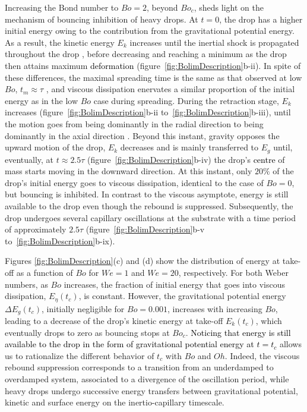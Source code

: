 \documentclass{jfm}
\newcommand{\Ohn}{\mathit{Oh}}
\newcommand{\Wen}{\mathit{We}}
\newcommand{\Bon}{\mathit{Bo}}
\newcommand{\Boc}{\mathit{Bo}_\mathit{c}}
\newcommand{\revRev}[1]{\textcolor{black}{#1}}
\begin{document}
Increasing the Bond number to $\Bon = 2$, beyond $\Boc$, sheds light on the mechanism of bouncing inhibition of heavy drops. At $t=0$, the drop has a higher initial energy owing to the contribution from the gravitational potential energy. As a result, the kinetic energy $E_k$ increases until the inertial shock is propagated throughout the drop \citep[see figure~\ref{fig:BolimDescription}b-i and][]{Gordillo2018, cheng2021drop}, before decreasing and reaching a minimum as the drop then attains maximum \revRev{deformation} (figure~\ref{fig:BolimDescription}b-ii).
In spite of these differences, the maximal spreading time is the same as that observed at low $\Bon$, $t_m \approx \tau$ \revRev{\citep[for $We = 1$, see][]{zhang2022impact}}, and viscous dissipation enervates a similar proportion of the initial energy as in the low $\Bon$ case during spreading.
During the retraction stage, $E_k$ increases (figure~\ref{fig:BolimDescription}b-ii to~\ref{fig:BolimDescription}b-iii), until the motion goes from being dominantly in the radial direction to being dominantly in the axial direction \citep[figure~\ref{fig:BolimDescription}b-iii, $t \approx 1.5\tau$, see][]{chantelot2018rebonds, zhang2022impact}.
Beyond this instant, gravity opposes the upward motion of the drop, $E_k$ decreases and is mainly transferred to $E_g$ until, eventually, at $t \approx 2.5\tau$ (figure~\ref{fig:BolimDescription}b-iv) the drop's \revRev{centre} of mass starts moving in the downward direction.
At this instant, only $20\%$ of the drop's initial energy goes to viscous dissipation, identical to the case of $\Bon = 0$, but bouncing is inhibited.
In contrast to the viscous asymptote, energy is still available to the drop even though the rebound is suppressed.
Subsequently, the drop undergoes several capillary oscillations at the substrate with a time period of approximately $2.5\tau$ (figure~\ref{fig:BolimDescription}b-v to~\ref{fig:BolimDescription}b-ix).

Figures \ref{fig:BolimDescription}(c) and (d) show the distribution of energy at take-off as a function of $\Bon$ for $\Wen = 1$ and $\Wen =20$, respectively.
For both Weber numbers, as $\Bon$ increases, the fraction of initial energy that goes into viscous dissipation, $E_\eta(t_c)$, is constant. 
However, the gravitational potential energy $\Delta E_g(t_c)$, initially negligible for $\Bon = 0.001$, increases with increasing $\Bon$, leading to a decrease of the drop's kinetic energy at take-off $E_k(t_c)$, which eventually drops to zero as bouncing stops at $\Boc$. 
\revRev{Noticing that energy is still available to the drop in the form of gravitational potential energy at $t=t_c$} allows us to rationalize the different behavior of $t_c$ with $\Bon$ and $\Ohn$. Indeed, the viscous rebound suppression corresponds to a transition from an underdamped to overdamped system, associated to a divergence of the oscillation period, while heavy drops undergo successive energy transfers between gravitational potential, kinetic and surface energy on the inertio-capillary timescale.
\end{document}
